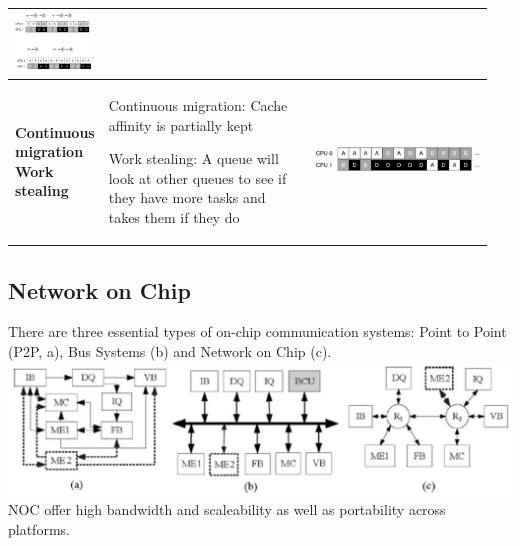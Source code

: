 \begin{longtable}{|>{\bfseries}p{0.1\linewidth}|p{0.45\linewidth}|p{0.4\linewidth}|}
			\includegraphics[width=\linewidth]{./pictures/mqms.png}\\
			\hline
			Continuous migration \newline\newline
			Work stealing
			&
			\begin{compactitem}
				\item Continuous migration: Cache affinity is partially kept
				\item Work stealing: A queue will look at other queues to see if they have more tasks and takes them if they do
			\end{compactitem}
			&
			\vspace{0pt}
			
			\includegraphics[width=\linewidth]{./pictures/mqms2.png}\\
			\hline
		\end{longtable}
	
	\subsection{Network on Chip}
		There are three essential types of on-chip communication systems: Point to Point (P2P, a), Bus Systems (b) and Network on Chip (c). \\
		\includegraphics[width=\linewidth]{./pictures/network.png}\\
		NOC offer high bandwidth and scaleability as well as portability across platforms.
		
